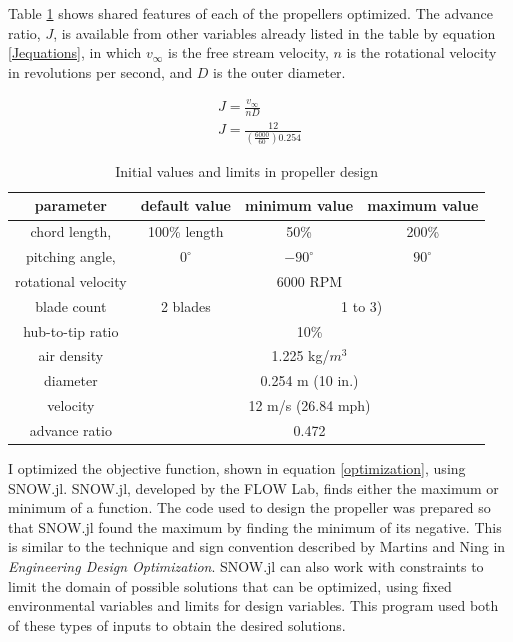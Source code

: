 \documentclass[journal ]{new-aiaa}
\newcounter{ctab}
\begin{document}
Table \ref{ctab} shows shared features of each of the propellers optimized. The advance ratio, $J$, is available from other variables already listed in the table by equation \ref{Jequations}, in which $v_{\infty}$ is the free stream velocity, $n$ is the rotational velocity in revolutions per second, and $D$ is the outer diameter.

\begin{equation}
	\begin{aligned}
	J = \frac{v_{\infty}}{n D} \\
	J = \frac{12}{(\frac{6000}{60}) 0.254}
	\end{aligned}
	\label{Jequations}
\end{equation}

\begin{table}[H]
 \centering
 \begin{tabular}{| c | c | c | c |} \hline
 	 \textbf{parameter} & \textbf{default value} & \textbf{minimum value} & \textbf{maximum value} \\ \hline
	 chord length, & 100\% length & 50\% & 200\% \\ \hline
	 pitching angle, & $0^{\circ}$ & $-90^{\circ}$ & $90^{\circ}$ \\ \hline \hline
	 rotational velocity & \multicolumn{3}{c|}{6000 RPM} \\ \hline
	 blade count & 2 blades & \multicolumn{2}{c|}{1 to 3)}\\ \hline
	 hub-to-tip ratio & \multicolumn{3}{c|}{10\%} \\ \hline
	 air density & \multicolumn{3}{c|}{1.225 kg/$m^{3}$} \\ \hline
	 diameter & \multicolumn{3}{c|}{0.254 m (10 in.)} \\ \hline
	 velocity & \multicolumn{3}{c|}{12 m/s (26.84 mph)} \\ \hline
	 advance ratio & \multicolumn{3}{c|}{0.472} \\ \hline
 \end{tabular}
 \caption{Initial values and limits in propeller design}
 \label{ctab}
\end{table}

I optimized the objective function, shown in equation \ref{optimization}, using SNOW.jl. SNOW.jl, developed by the FLOW Lab, finds either the maximum or minimum of a function. The code used to design the propeller was prepared so that SNOW.jl found the maximum by finding the minimum of its negative. This is similar to the technique and sign convention described by Martins and Ning in \emph{Engineering Design Optimization}\cite{EngDesOpt}. SNOW.jl can also work with constraints to limit the domain of possible solutions that can be optimized, using fixed environmental variables and limits for design variables. This program used both of these types of inputs to obtain the desired solutions.
\end{document}
